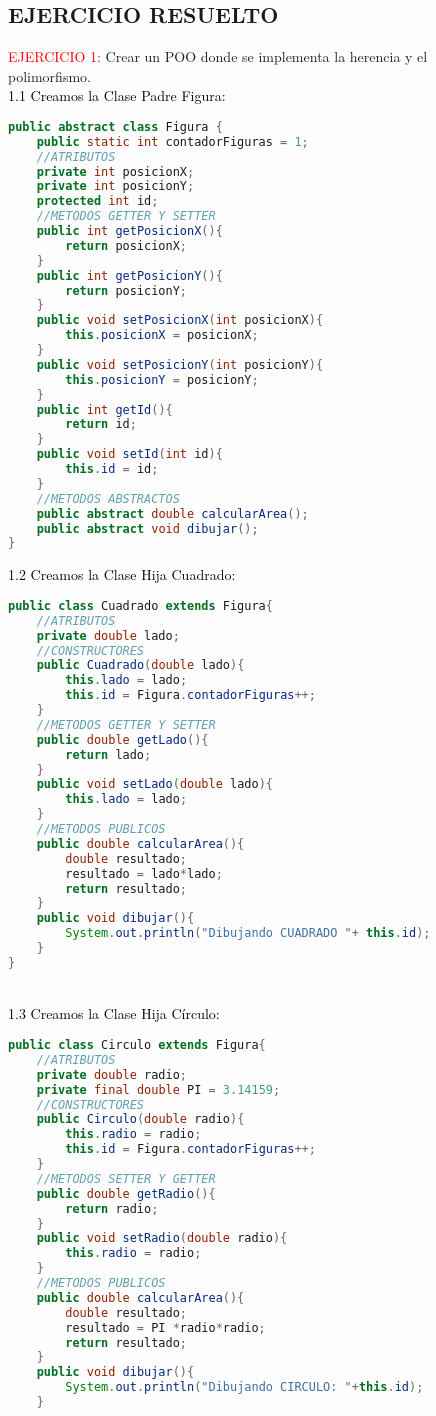 \documentclass{article}
\begin{document}
\begin{itemize}
    \section{EJERCICIO RESUELTO}
	\begin{itemize}
        \textcolor{red}{EJERCICIO 1:} Crear un POO donde se implementa la herencia y el polimorfismo.
        \newline
        \\
        \textcolor{black}{1.1 Creamos la Clase Padre Figura:} 
		\begin{lstlisting}[language=java]
public abstract class Figura {
    public static int contadorFiguras = 1;
    //ATRIBUTOS
    private int posicionX;
    private int posicionY;
    protected int id;
    //METODOS GETTER Y SETTER
    public int getPosicionX(){
        return posicionX;
    }
    public int getPosicionY(){
        return posicionY;
    }
    public void setPosicionX(int posicionX){
        this.posicionX = posicionX;
    }
    public void setPosicionY(int posicionY){
        this.posicionY = posicionY;
    }
    public int getId(){
        return id;
    }
    public void setId(int id){
        this.id = id;
    }
    //METODOS ABSTRACTOS
    public abstract double calcularArea();
    public abstract void dibujar();
}
        \end{lstlisting}
        \textcolor{black}{1.2 Creamos la Clase Hija Cuadrado:} 
		\begin{lstlisting}[language=java]
public class Cuadrado extends Figura{
    //ATRIBUTOS
    private double lado;
    //CONSTRUCTORES
    public Cuadrado(double lado){
        this.lado = lado;
        this.id = Figura.contadorFiguras++;
    }
    //METODOS GETTER Y SETTER
    public double getLado(){
        return lado;
    }
    public void setLado(double lado){
        this.lado = lado;
    }
    //METODOS PUBLICOS
    public double calcularArea(){
        double resultado;
        resultado = lado*lado;
        return resultado;
    }
    public void dibujar(){
        System.out.println("Dibujando CUADRADO "+ this.id);
    }
}
        \end{lstlisting}
        \newline
        \\
        \textcolor{black}{1.3 Creamos la Clase Hija Círculo:} 
		\begin{lstlisting}[language=java]
public class Circulo extends Figura{
    //ATRIBUTOS
    private double radio;
    private final double PI = 3.14159;
    //CONSTRUCTORES
    public Circulo(double radio){
        this.radio = radio;
        this.id = Figura.contadorFiguras++;
    }
    //METODOS SETTER Y GETTER
    public double getRadio(){
        return radio;
    }
    public void setRadio(double radio){
        this.radio = radio;
    }
    //METODOS PUBLICOS
    public double calcularArea(){
        double resultado;
        resultado = PI *radio*radio;
        return resultado;
    }
    public void dibujar(){
        System.out.println("Dibujando CIRCULO: "+this.id);
    }
    

\end{lstlisting}
\end{itemize}
\end{itemize}
\end{document}
